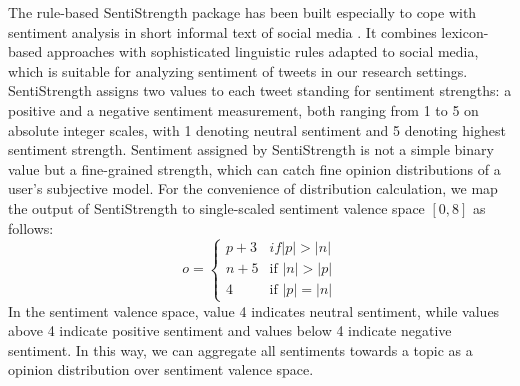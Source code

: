 \documentclass{acm_proc_article-sp}
\begin{document}
The rule-based SentiStrength package has been built especially to cope with sentiment analysis in short informal text of social media \cite{Thelwall:2010SSS}.
It combines lexicon-based approaches with sophisticated linguistic rules adapted to social media, which is suitable for analyzing sentiment of tweets in our research settings.
SentiStrength assigns two values to each tweet standing for sentiment strengths: a positive and a negative sentiment measurement, both ranging from 1 to 5 on absolute integer scales, with 1 denoting neutral sentiment and 5 denoting highest sentiment strength.
Sentiment assigned by SentiStrength is not a simple binary value but a fine-grained strength, which can catch fine opinion distributions of a user's subjective model. 
For the convenience of distribution calculation, we map the output of SentiStrength to single-scaled sentiment valence space $ \left[ 0, 8 \right] $ as follows:
\begin{equation}
\label{opinionmap}
o= \left\{ 
\begin{array}{lll}
{p+3} & if \vert p \vert > \vert n \vert \\
{n+5} & \text{if } \vert n \vert > \vert p \vert \\
{4}  & \text{if } \vert p \vert = \vert n \vert
\end{array}
\right.
\end{equation}
In the sentiment valence space, value 4 indicates neutral sentiment, while values above 4 indicate positive sentiment and values below 4 indicate negative sentiment. In this way, we can aggregate all sentiments towards a topic as a opinion distribution over sentiment valence space.
\end{document}

